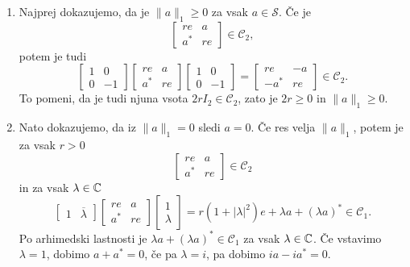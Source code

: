 \begin{dokaz}
    \begin{enumerate}
        \item Najprej dokazujemo, da je $\| a\|_1 \geq 0$ za vsak $a \in \mathcal{S}$.
        Če je $$\begin{bmatrix}
            r e & a\\
            a^* & re
        \end{bmatrix} \in \mathcal{C}_2,$$
        potem je tudi 
        $$\begin{bmatrix}
            1 & 0\\
            0 & -1
        \end{bmatrix}\begin{bmatrix}
            r e & a\\
            a^* & re
        \end{bmatrix}\begin{bmatrix}
            1 & 0\\
            0 & -1
        \end{bmatrix} = \begin{bmatrix}
            re & -a\\
            -a^* & re
        \end{bmatrix} \in \mathcal{C}_2.$$
        To pomeni, da je tudi njuna vsota $2r I_2 \in \mathcal{C}_2$, zato je $2r \geq 0$ in $\| a\|_1 \geq 0$.
        \item Nato dokazujemo, da iz $\| a\|_1 = 0$ sledi $a = 0$.
        Če res velja $\| a\|_1$, potem je za vsak $r > 0$
        $$\begin{bmatrix}
            re & a\\
            a^* & re
        \end{bmatrix} \in \mathcal{C}_2$$
        in za vsak $\lambda \in \mathbb C$ 
        $$\begin{bmatrix}
            1 & \overline{\lambda}
        \end{bmatrix}\begin{bmatrix}
            re & a\\
            a^* & re
        \end{bmatrix}\begin{bmatrix}
            1 \\ \lambda
        \end{bmatrix} = r (1 + |\lambda|^2)e + \lambda a + (\lambda a)^* \in \mathcal{C}_1.$$
        Po arhimedski lastnosti je $\lambda a + (\lambda a)^* \in \mathcal{C}_1$ za vsak $\lambda \in \mathbb C$.
        Če vstavimo $\lambda = 1$, dobimo $a + a^* = 0$, če pa $\lambda = i$, pa dobimo $ia - ia^* = 0$.

\end{enumerate}
\end{dokaz}
